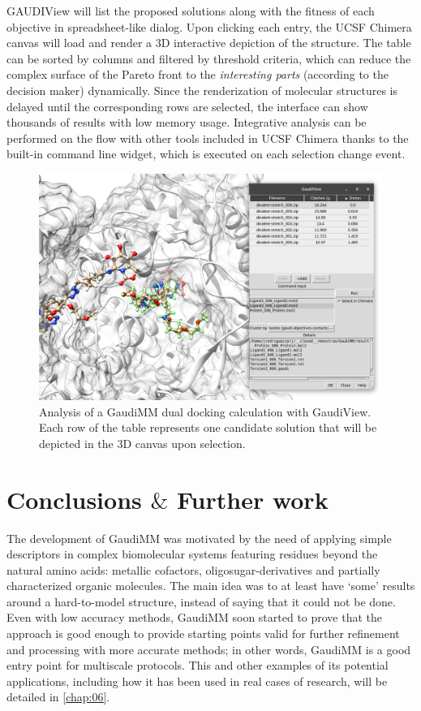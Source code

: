 GAUDIView will list the proposed solutions along with the fitness of each objective in spreadsheet-like dialog. Upon clicking each entry, the UCSF Chimera canvas will load and render a 3D interactive depiction of the structure. The table can be sorted by columns and filtered by threshold criteria, which can reduce the complex surface of the Pareto front to the \textit{interesting parts} (according to the decision maker) dynamically. Since the renderization of molecular structures is delayed until the corresponding rows are selected, the interface can show thousands of results with low memory usage. Integrative analysis can be performed on the flow with other tools included in UCSF Chimera thanks to the built-in command line widget, which is executed on each selection change event.


\begin{figure}[H]
	\includegraphics[width=\textwidth]{./figures/04/gaudiview.png}
	\caption[GaudiView]{Analysis of a GaudiMM dual docking calculation with GaudiView. Each row of the table represents one candidate solution that will be depicted in the 3D canvas upon selection.}
	\label{fig:gaudiview}
\end{figure}


\section{Conclusions $\&$  Further work}

The development of GaudiMM was motivated by the need of applying simple descriptors in complex biomolecular systems featuring residues beyond the natural amino acids: metallic cofactors, oligosugar-derivatives and partially characterized organic molecules. The main idea was to at least have ‘some’ results around a hard-to-model structure, instead of saying that it could not be done. Even with low accuracy methods, GaudiMM soon started to prove that the approach is good enough to provide starting points valid for further refinement and processing with more accurate methods; in other words, GaudiMM is a good entry point for multiscale protocols. This and other examples of its potential applications, including how it has been used in real cases of research, will be detailed in \autoref{chap:06}.

